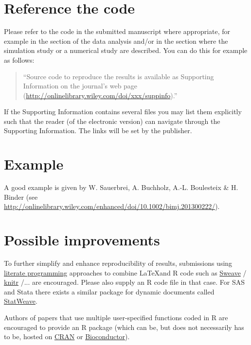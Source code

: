 \documentclass[12pt,a4paper]{article}
\begin{document}

\section{Reference the code}

Please refer to the code in the submitted manuscript where appropriate, for
example in the section of the data analysis and/or in the section where the
simulation study or a numerical study are described. You can do this for example
as follows:
\begin{quote}
  ``Source code to reproduce the results is available as Supporting Information
  on the journal's web page (\url{http://onlinelibrary.wiley.com/doi/xxx/suppinfo}).''
\end{quote}

If the Supporting Information contains several files you may list them
explicitly such that the reader (of the electronic version) can navigate through
the Supporting Information. The links will be set by the publisher.

\section{Example}

A good example is given by W. Sauerbrei, A. Buchholz, A.-L. Boulesteix \& H.
Binder (see \url{http://onlinelibrary.wiley.com/enhanced/doi/10.1002/bimj.201300222/}).


\section{Possible improvements}

To further simplify and enhance reproducibility of results, submissions using
\href{http://en.wikipedia.org/wiki/Literate_Programming}{literate programming}
approaches to combine \LaTeX and \textsf{R} code such as
\href{http://en.wikipedia.org/wiki/Sweave}{Sweave}
\citep{Leisch:2002,Leisch:2003}/
\href{http://en.wikipedia.org/wiki/Knitr}{knitr} \citep{Xie:2013,Xie:2014}/...
are encouraged. Please also supply an \textsf{R} code file in that case. For
\textsf{SAS} and \textsf{Stata} there exists a similar package for dynamic
documents called
\href{http://homepage.stat.uiowa.edu/~rlenth/StatWeave/}{StatWeave}.

Authors of papers that use multiple user-specified functions coded in \textsf{R}
are encouraged to provide an \textsf{R} package (which can be, but does not
necessarily has to be, hosted on \href{http://cran.r-project.org/}{CRAN} or
\href{http://bioconductor.org/}{Bioconductor}).




\end{document}
